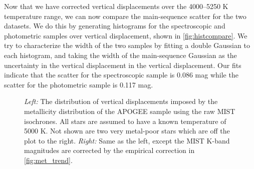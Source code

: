 \documentclass[manuscript]{aastex6}
\begin{document}
\begin{figure*}[htb]
    \centering
    \caption{\emph{Left:} Histogram showing the distribution of vertical 
        displacements with isochrones corresponding to APOGEE metallicities.
        The blue line denotes the best-fit double-Gaussian model to the
        distribution of vertical displacements. The red line is a fit to the
        best-fit double-Gaussian model assuming a single metallicity (see right
        panel). Conservative and inclusive photometric binary thresholds at 
        \(\Delta K < -0.41\) mag and \(\Delta K < -0.28\) mag are shown as violet and green dashed 
        lines, respectively. The best-fit dispersion of the single-star 
        Gaussian is 0.086 mag. \emph{Right:} Histogram showing the 
        distribution of vertical displacements with a \([Fe/H] = 0.08\) 
        isochrone. The red line denotes the best-fit double-Gaussian model to
        the distribution of vertical displacements. The blue line is a fit to
        the best-fit double-Gaussian model for isochrones adjusted for the
        APOGEE metallicity (see left panel). Conservative and inclusive
        photometric binary thresholds are shown as violet and green dashed 
        lines, respectively. The best-fit dispersion of the single-star 
        Gaussian is 0.117 mag.}\label{fig:histcompare}
\end{figure*}

Now that we have corrected vertical displacements over the 4000--5250 K
temperature range, we can now compare the main-sequence scatter for the two
datasets. We do this by generating histograms for the spectroscopic and
photometric samples over vertical displacement, shown in
\cref{fig:histcompare}. We try to characterize the width of the two samples by
fitting a double Gaussian to each histogram, and taking the width of the
main-sequence Gaussian as the uncertainty in the vertical displacement in the
vertical displacement. Our fits indicate that the scatter for the spectroscopic
sample is 0.086 mag while the scatter for the photometric sample is 0.117 mag.

\begin{figure}[htb]
    \centering
    \caption{\emph{Left:} The distribution of vertical displacements imposed
    by the metallicity distribution of the APOGEE sample using the raw MIST
    isochrones. All stars are assumed to have a known temperature of 5000 K. 
    Not shown are two very metal-poor stars which are off the plot to the 
    right. \emph{Right:} Same as the left, except the MIST K-band magnitudes
are corrected by the empirical correction in
\cref{fig:met_trend}.}\label{fig:met_spread}
\end{figure}
\end{document}
